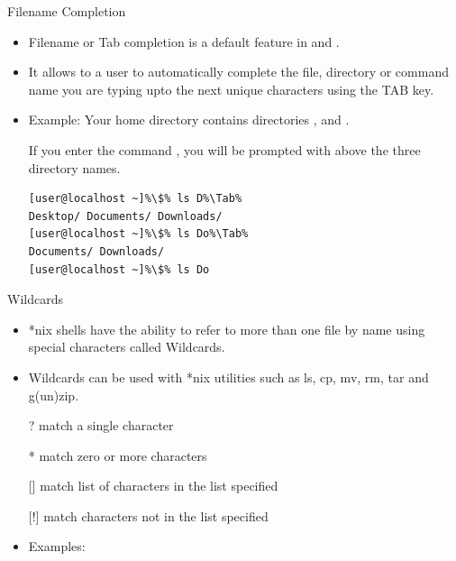 \documentclass[10pt,t]{beamer}
\begin{document}
\begin{frame}[fragile]{Filename Completion}
  \begin{itemize}
    \item Filename or Tab completion is a default feature in  and .
    \item It allows to a user to automatically complete the file, directory or command name you are typing upto the next unique characters using the TAB key.
    \item Example: Your home directory contains directories ,  and .
    \item[] If you enter the command , you will be prompted with above the three directory names.
      \begin{lstlisting}[basicstyle=\color{lubrown}\bfseries\scriptsize\ttfamily,escapechar=\%]
[user@localhost ~]%\$% ls D%\Tab%
Desktop/ Documents/ Downloads/
[user@localhost ~]%\$% ls Do%\Tab%
Documents/ Downloads/
[user@localhost ~]%\$% ls Do
      \end{lstlisting}
  \end{itemize}
\end{frame}

\begin{frame}{Wildcards}
  \begin{itemize}
    \item *nix shells have the ability to refer to more than one file by name using special characters called Wildcards.
    \item Wildcards can be used with *nix utilities such as ls, cp, mv, rm, tar and g(un)zip.
    \item[?] match a single character
    \item[*] match zero or more characters
    \item[{[\quad]}] match list of characters in the list specified
    \item[{[!\quad]}] match characters not in the list specified
    \item Examples:
  \end{itemize}
\end{frame}
\end{document}
